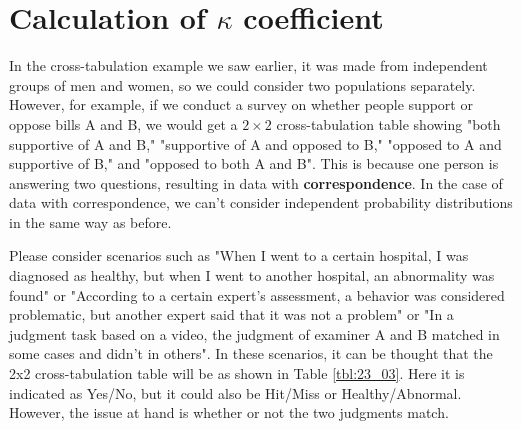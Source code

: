 \documentclass{ltjsbook}
\begin{document}
\section{Calculation of $\kappa$ coefficient}
In the cross-tabulation example we saw earlier, it was made from independent groups of men and women, so we could consider two populations separately. However, for example, if we conduct a survey on whether people support or oppose bills A and B, we would get a $2\times2$ cross-tabulation table showing "both supportive of A and B," "supportive of A and opposed to B," "opposed to A and supportive of B," and "opposed to both A and B". This is because one person is answering two questions, resulting in data with \textbf{correspondence}. In the case of data with correspondence, we can't consider independent probability distributions in the same way as before.

Please consider scenarios such as "When I went to a certain hospital, I was diagnosed as healthy, but when I went to another hospital, an abnormality was found" or "According to a certain expert's assessment, a behavior was considered problematic, but another expert said that it was not a problem" or "In a judgment task based on a video, the judgment of examiner A and B matched in some cases and didn't in others". In these scenarios, it can be thought that the 2x2 cross-tabulation table will be as shown in Table \ref{tbl:23_03}. Here it is indicated as Yes/No, but it could also be Hit/Miss or Healthy/Abnormal. However, the issue at hand is whether or not the two judgments match.
\end{document}
